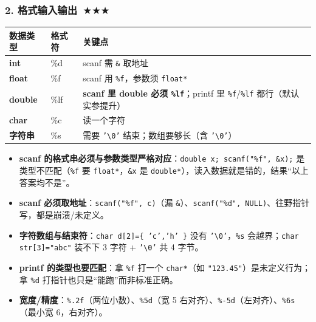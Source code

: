 \documentclass[UTF8,zihao=-4,a4paper]{ctexart}
\newcommand{\cstar}{\textcolor{deepred}{$\bigstar$}}
\begin{document}
\subsubsection*{2. 格式输入输出\ \cstar\cstar\cstar}
\begin{center}\small
\begin{tabularx}{\linewidth}{>{\bfseries}p{2.4cm} >{\ttfamily}p{2.6cm} X}
\toprule
数据类型 & 格式符 & 关键点\\
\midrule
int & \%d & scanf 需 \texttt{\&} 取地址\\
float & \%f & scanf 用 \texttt{\%f}，参数须 \texttt{float*}\\
double & \%lf & \textbf{scanf 里 double 必须 \texttt{\%lf}}；printf 里 \texttt{\%f}/\texttt{\%lf} 都行（默认实参提升）\\
char & \%c & 读一个字符\\
字符串 & \%s & 需要 \texttt{'\textbackslash 0'} 结束；数组要够长（含 \texttt{'\textbackslash 0'}）\\
\bottomrule
\end{tabularx}
\end{center}

\begin{itemize}
  \item \textbf{scanf 的格式串必须与参数类型严格对应}：\texttt{double x; scanf("\%f", \&x);} 是类型不匹配（\texttt{\%f} 要 \texttt{float*}，\texttt{\&x} 是 \texttt{double*}），读入数据就是错的，结果“以上答案均不是”。
  \item \textbf{scanf 必须取地址}：\texttt{scanf("\%f", c)}（漏 \texttt{\&}）、\texttt{scanf("\%d", NULL)}、往野指针写，都是崩溃/未定义。
  \item \textbf{字符数组与结束符}：\texttt{char d[2]=\{ 'c','h' \}} 没有 \texttt{'\textbackslash 0'}，\texttt{\%s} 会越界；\texttt{char str[3]="abc"} 装不下 3 字符 + \texttt{'\textbackslash 0'} 共 4 字节。
  \item \textbf{printf 的类型也要匹配}：拿 \texttt{\%f} 打一个 \texttt{char*}（如 \texttt{"123.45"}）是未定义行为；拿 \texttt{\%d} 打指针也只是“能跑”而非标准正确。
  \item \textbf{宽度/精度}：\texttt{\%.2f}（两位小数）、\texttt{\%5d}（宽 5 右对齐）、\texttt{\%-5d}（左对齐）、\texttt{\%6s}（最小宽 6，右对齐）。
\end{itemize}
\end{document}
